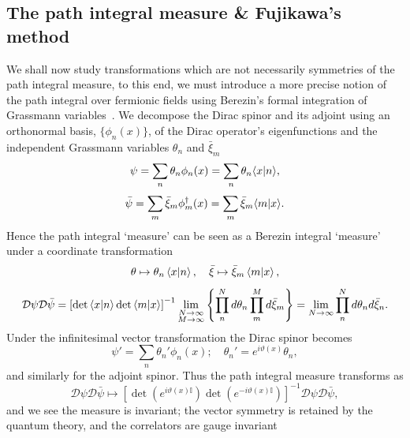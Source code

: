 \documentclass[11pt, a4paper]{article}
\begin{document}
\subsection{The path integral measure \& Fujikawa's method}
We shall now study transformations which are not necessarily symmetries
of the path integral measure, to this end, we must introduce a more
precise notion of the path integral over fermionic fields using
Berezin's formal integration of Grassmann variables~\cite{BerezinBook}.
We decompose the Dirac spinor and its adjoint using an orthonormal basis, $\{ \phi_n(x) \}$, of
the Dirac operator's eigenfunctions and the independent Grassmann variables 
$\theta_n$ and $\bar{\xi}_m$
\begin{equation}
  \psi = \sum_n{\theta_n\phi_n(x)} = \sum_n{\theta_n\!\braket{x|n}},
\end{equation}
\begin{equation}
  \bar{\psi} = \sum_m{\bar{\xi}_m\phi^{\dagger}_m(x)} = \sum_m{\bar{\xi}_m\!\braket{m|x}}.
  \end{equation}
Hence the path integral `measure' can be seen as a
Berezin integral `measure' under a coordinate transformation
\begin{equation}
  \theta \mapsto \theta_n\braket{x|n},\quad
  \bar{\xi} \mapsto \bar{\xi}_m\braket{m|x},
\end{equation}
\begin{equation}
  \mathcal{D}\psi\mathcal{D}\bar{\psi}
  = {\left[\det{\braket{x|n}}\det{\braket{m|x}}\right]}^{-1}
  \lim_{\substack{N \rightarrow \infty \\
  M \rightarrow \infty}}{\left\{ \prod_n^N{d\theta_n}\prod_m^M{d\bar{\xi}_m} \right\}}
  = \lim_{N \rightarrow \infty}{\prod_n^N{d\theta_n d\bar{\xi}_n}}.
\end{equation}
Under the infinitesimal vector transformation the Dirac spinor becomes
\begin{equation}
  \psi' = \sum_n{\theta_n'\phi_n(x)} ;\quad \theta_n' = e^{i\vartheta(x)}\theta_n,
\end{equation}
and similarly for the adjoint spinor. Thus the path integral measure transforms as
\begin{equation}
  \mathcal{D}\psi\mathcal{D}\bar{\psi} \mapsto
  {\left[\det{\left(e^{i\vartheta(x)\mathbb{I}}\right)}
  \det{\left(e^{-i\vartheta(x)\mathbb{I}}\right)} \right]}^{-1}
  \mathcal{D}\psi\mathcal{D}\bar{\psi},
\end{equation}
and we see the measure is invariant; the vector symmetry is retained
by the quantum theory, and the correlators are gauge invariant
\end{document}

